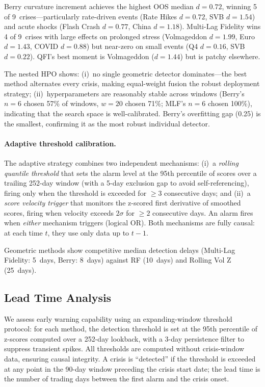 \documentclass[3p]{elsarticle}
\begin{document}
Berry curvature increment achieves the highest OOS median $d = 0.72$,
winning 5 of 9~crises---particularly rate-driven events (Rate Hikes
$d = 0.72$, SVB $d = 1.54$) and acute shocks (Flash Crash $d = 0.77$,
China $d = 1.18$).  Multi-Lag Fidelity wins 4 of 9~crises with
large effects on prolonged stress (Volmageddon $d = 1.99$, Euro
$d = 1.43$, COVID $d = 0.88$) but near-zero on small events (Q4
$d = 0.16$, SVB $d = 0.22$).  QFI's best moment is Volmageddon
($d = 1.44$) but is patchy elsewhere.

The nested HPO shows:
(i)~no single geometric detector dominates---the best method alternates
every crisis, making equal-weight fusion the robust deployment strategy;
(ii)~hyperparameters are reasonably stable across windows (Berry's
$n{=}6$ chosen 57\% of windows, $w{=}20$ chosen 71\%; MLF's $n{=}6$
chosen 100\%), indicating that the search space is well-calibrated.
Berry's overfitting gap (0.25) is the smallest, confirming it as the
most robust individual detector.

\paragraph{Adaptive threshold calibration.}\label{subsec:adaptive_threshold}
The adaptive strategy combines two independent mechanisms:
(i)~a \emph{rolling quantile threshold} that sets the alarm level at
the 95th percentile of scores over a trailing 252-day window
(with a 5-day exclusion gap to avoid self-referencing), firing only
when the threshold is exceeded for $\geq 3$ consecutive days; and
(ii)~a \emph{score velocity trigger} that monitors the z-scored
first derivative of smoothed scores, firing when velocity exceeds
$2\sigma$ for $\geq 2$ consecutive days.  An alarm fires when
\emph{either} mechanism triggers (logical OR).  Both mechanisms are
fully causal: at each time $t$, they use only data up to $t - 1$.

Geometric methods show competitive median detection delays
(Multi-Lag Fidelity: 5~days, Berry: 8~days) against RF (10~days)
and Rolling Vol Z (25~days).

\subsection{Lead Time Analysis}\label{subsec:lead_time}

We assess early warning capability using an expanding-window threshold
protocol: for each method, the detection threshold is set at the 95th
percentile of z-scores computed over a 252-day lookback, with a 3-day
persistence filter to suppress transient spikes.  All thresholds are
computed without crisis-window data, ensuring causal integrity.  A
crisis is ``detected'' if the threshold is exceeded at any point in the
90-day window preceding the crisis start date; the lead time is the
number of trading days between the first alarm and the crisis onset.
\end{document}
